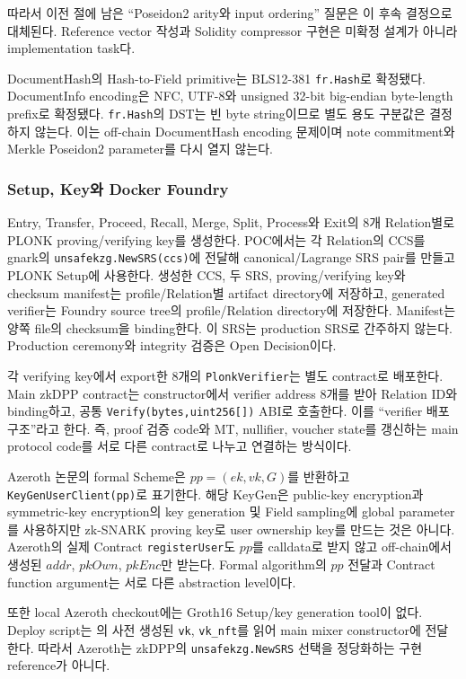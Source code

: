 \documentclass[11pt]{extarticle}
\begin{document}
따라서 이전 절에 남은 ``Poseidon2 arity와 input ordering'' 질문은 이 후속 결정으로
대체된다. Reference vector 작성과 Solidity compressor 구현은 미확정 설계가 아니라
implementation task다.

DocumentHash의 Hash-to-Field primitive는 BLS12-381 \texttt{fr.Hash}로 확정됐다.
DocumentInfo encoding은 NFC, UTF-8와 unsigned 32-bit big-endian byte-length prefix로
확정됐다. \texttt{fr.Hash}의 DST는 빈 byte string이므로 별도 용도 구분값은 결정하지
않는다. 이는 off-chain DocumentHash encoding 문제이며 note commitment와 Merkle
Poseidon2 parameter를 다시 열지 않는다.

\subsubsection{Setup, Key와 Docker Foundry}

Entry, Transfer, Proceed, Recall, Merge, Split, Process와 Exit의 8개 Relation별로
PLONK proving/verifying key를 생성한다. POC에서는 각 Relation의 CCS를 gnark의
\texttt{unsafekzg.NewSRS(ccs)}에 전달해 canonical/Lagrange SRS pair를 만들고
PLONK Setup에 사용한다. 생성한 CCS, 두 SRS, proving/verifying key와 checksum manifest는
profile/Relation별 artifact directory에 저장하고, generated verifier는 Foundry source
tree의 profile/Relation directory에 저장한다. Manifest는 양쪽 file의 checksum을
binding한다. 이 SRS는
production SRS로 간주하지 않는다. Production ceremony와 integrity 검증은 Open Decision이다.

각 verifying key에서 export한 8개의 \texttt{PlonkVerifier}는 별도 contract로 배포한다.
Main zkDPP contract는 constructor에서 verifier address 8개를 받아 Relation ID와 binding하고,
공통 \texttt{Verify(bytes,uint256[])} ABI로 호출한다. 이를 ``verifier 배포 구조''라고 한다.
즉, proof 검증 code와 MT, nullifier, voucher state를 갱신하는 main protocol code를 서로
다른 contract로 나누고 연결하는 방식이다.

Azeroth 논문의 formal Scheme은 $pp=(ek,vk,G)$를 반환하고
\texttt{KeyGenUserClient(pp)}로 표기한다. 해당 KeyGen은 public-key encryption과
symmetric-key encryption의 key generation 및 Field sampling에 global parameter를
사용하지만 zk-SNARK proving key로 user ownership key를 만드는 것은 아니다.
Azeroth의 실제 Contract \texttt{registerUser}도 $pp$를 calldata로 받지 않고
off-chain에서 생성된 $addr$, $pkOwn$, $pkEnc$만 받는다. Formal algorithm의 $pp$ 전달과
Contract function argument는 서로 다른 abstraction level이다.

또한 local Azeroth checkout에는 Groth16 Setup/key generation tool이 없다. Deploy script는
의 사전 생성된 \texttt{vk}, \texttt{vk\_nft}를 읽어
main mixer constructor에 전달한다. 따라서 Azeroth는 zkDPP의
\texttt{unsafekzg.NewSRS} 선택을 정당화하는 구현 reference가 아니다.
\end{document}
